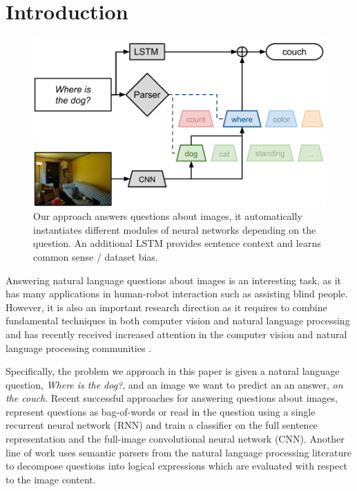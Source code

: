\section{Introduction}
\begin{figure}[t]
\begin{center}
\includegraphics[width=\linewidth]{fig/teaser}
\end{center}
   \caption{Our approach answers questions about images, it automatically instantiates different modules of neural networks depending on the question. An additional LSTM provides sentence context and learns common sense / dataset bias.}
\label{fig:teaser}
\end{figure}
Answering natural language questions about images is an interesting task, as it has many applications in human-robot interaction such as assisting blind people. However, it is also an important research direction as it requires to combine fundamental techniques in both computer vision and natural language processing and has recently received increased attention in the computer vision and natural language processing communities \cite{malinowski15iccv}\cite{}\cite{}.

Specifically, the problem we approach in this paper is given a natural language question, \eg \emph{Where is the dog?}, and an image we want to predict an an answer, \eg \emph{on the couch}. 
Recent successful approaches for answering questions about images, represent questions as bag-of-words \cite{} or read in the question using a single recurrent neural network (RNN) \cite{malinowski15iccv}\cite{} and train a classifier on the full sentence representation and the full-image convolutional neural network (CNN). 
Another line of work  \cite{} uses semantic parsers from the natural language processing
literature to decompose questions into logical expressions which are evaluated with respect to the image content.

